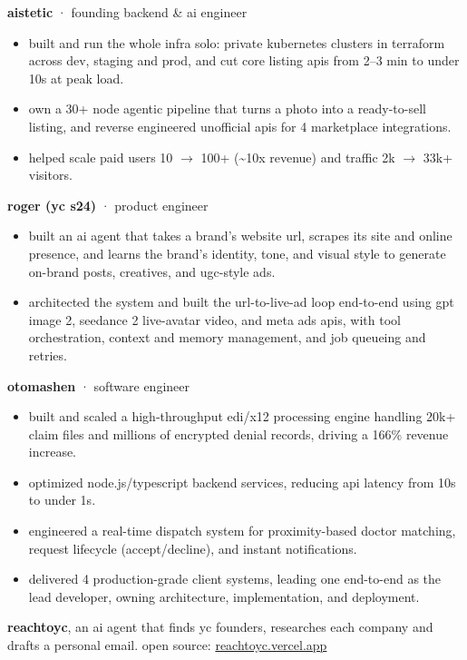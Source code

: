 \documentclass[10pt,a4paper]{article}
\newcommand{\heading}[1]{\vspace{4pt}{\color{accent}\footnotesize\bfseries\MakeUppercase{#1}}\par\vspace{-2pt}}
\newcommand{\lnk}[2]{\href{#1}{#2}}
\begin{document}
\textbf{aistetic} {\color{muted}· founding backend \& ai engineer}
\begin{itemize}
\item built and run the whole infra solo: private kubernetes clusters in terraform across dev, staging and prod, and cut core listing apis from 2--3 min to under 10s at peak load.
\item own a 30+ node agentic pipeline that turns a photo into a ready-to-sell listing, and reverse engineered unofficial apis for 4 marketplace integrations.
\item helped scale paid users 10 $\rightarrow$ 100+ (\textasciitilde 10x revenue) and traffic 2k $\rightarrow$ 33k+ visitors.
\end{itemize}

\textbf{roger (yc s24)} {\color{muted}· product engineer}
\begin{itemize}
\item built an ai agent that takes a brand's website url, scrapes its site and online presence, and learns the brand's identity, tone, and visual style to generate on-brand posts, creatives, and ugc-style ads.
\item architected the system and built the url-to-live-ad loop end-to-end using gpt image 2, seedance 2 live-avatar video, and meta ads apis, with tool orchestration, context and memory management, and job queueing and retries.
\end{itemize}

\textbf{otomashen} {\color{muted}· software engineer}
\begin{itemize}
\item built and scaled a high-throughput edi/x12 processing engine handling 20k+ claim files and millions of encrypted denial records, driving a 166\% revenue increase.
\item optimized node.js/typescript backend services, reducing api latency from 10s to under 1s.
\item engineered a real-time dispatch system for proximity-based doctor matching, request lifecycle (accept/decline), and instant notifications.
\item delivered 4 production-grade client systems, leading one end-to-end as the lead developer, owning architecture, implementation, and deployment.
\end{itemize}

\heading{things i've built on my own}

\textbf{reachtoyc}, an ai agent that finds yc founders, researches each company and drafts a personal email. open source: \lnk{https://reachtoyc.vercel.app}{reachtoyc.vercel.app}
\end{document}
